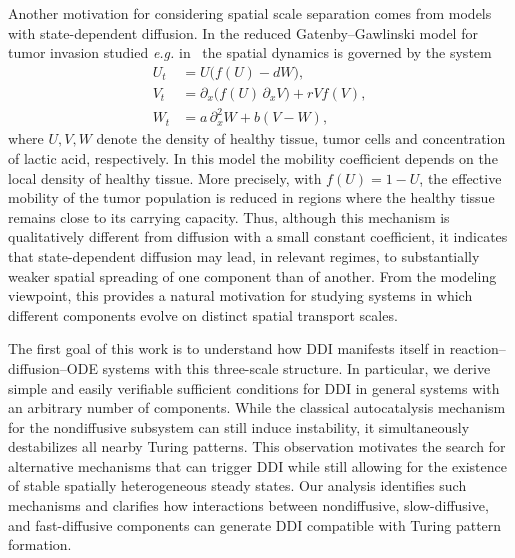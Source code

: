 \documentclass[12pt, a4paper]{amsart}
\numberwithin{equation}{section}
\begin{document}
Another motivation for considering spatial scale separation comes from models with 
state-dependent diffusion. In the reduced 
Gatenby--Gawlinski model for tumor invasion studied \textit{e.g.} in~\cite{GALLAY2022103387} the spatial dynamics is governed by the system
\begin{align}
 U_t &= U\big( f(U) - dW \big), \\
 V_t &= \partial_x \big( f(U)\,\partial_x V \big) + rV f(V), \\
 W_t &= a\,\partial_x^{2} W + b(V - W),
\end{align}
where $U, V, W$ denote the density of healthy tissue, tumor cells and concentration of lactic acid, respectively. In this model the mobility coefficient depends on the local density of healthy tissue. More precisely, with $f(U)=1-U$, the effective mobility of the tumor population is reduced in regions where the healthy tissue remains close to its carrying capacity. Thus, although this mechanism is qualitatively different from diffusion with a small constant coefficient, it indicates that state-dependent diffusion may lead, in relevant regimes, to substantially weaker spatial spreading of one component than of another. From the modeling viewpoint, this provides a natural motivation for studying systems in which different components evolve on distinct spatial transport scales.

The first goal of this work is to understand how DDI manifests itself in reaction--diffusion--ODE systems with this three-scale structure. In particular, we derive simple and easily verifiable sufficient conditions for DDI in general systems with an arbitrary number of components. While the classical autocatalysis mechanism for the nondiffusive subsystem can still induce instability, it simultaneously destabilizes all nearby Turing patterns. This observation motivates the search for alternative mechanisms that can trigger DDI while still allowing for the existence of stable spatially heterogeneous steady states. Our analysis identifies such mechanisms and clarifies how interactions between nondiffusive, slow-diffusive, and fast-diffusive components can generate DDI compatible with Turing pattern formation.
\end{document}
